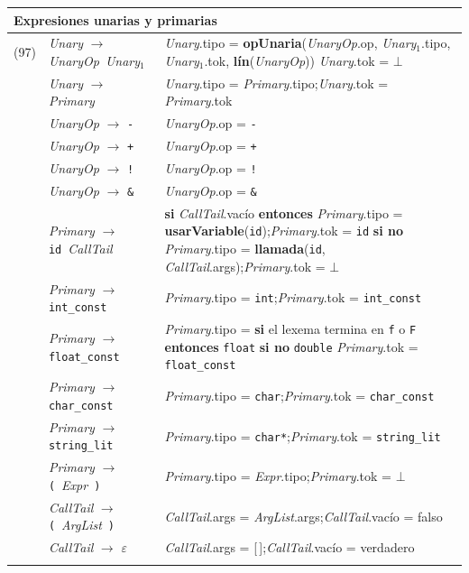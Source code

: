 \documentclass[11pt]{article}
\newcommand{\NT}[1]{\textcolor{ntcolor}{\textit{#1}}}            %
\newcommand{\T}[1]{\textcolor{tcolor}{\texttt{#1}}}              %
\newcommand{\A}[2]{\NT{#1}.\textsf{#2}}                          %
\newcommand{\Ax}[3]{\NT{#1}$_{#2}$.\textsf{#3}}                  %
\newcommand{\fn}[1]{\textsf{\textbf{#1}}}                        %
\newcommand{\ty}[1]{\texttt{#1}}                                 %
\newcommand{\kw}[1]{\textbf{#1}}                                 %
\begin{document}
{\begin{longtable}{@{}r@{\hspace{6pt}}>{\raggedright\arraybackslash}p{5.6cm}@{\hspace{8pt}}>{\raggedright\arraybackslash}p{9.9cm}@{}}
\multicolumn{3}{l}{\textbf{Expresiones unarias y primarias}} \\ \midrule
{(97)} & \NT{Unary} $\rightarrow$ \NT{UnaryOp}\ \NT{Unary}$_{1}$ & \A{Unary}{tipo} = \fn{opUnaria}(\A{UnaryOp}{op}, \Ax{Unary}{1}{tipo}, \Ax{Unary}{1}{tok}, \fn{lín}(\NT{UnaryOp})) \newline \A{Unary}{tok} = $\bot$ \\
\addlinespace[2pt]
{(98)} & \NT{Unary} $\rightarrow$ \NT{Primary} & \A{Unary}{tipo} = \A{Primary}{tipo};\quad \A{Unary}{tok} = \A{Primary}{tok} \\
\addlinespace[2pt]
{(99)} & \NT{UnaryOp} $\rightarrow$ \T{-} & \A{UnaryOp}{op} = \T{-} \\
\addlinespace[2pt]
{(100)} & \NT{UnaryOp} $\rightarrow$ \T{+} & \A{UnaryOp}{op} = \T{+} \\
\addlinespace[2pt]
{(101)} & \NT{UnaryOp} $\rightarrow$ \T{!} & \A{UnaryOp}{op} = \T{!} \\
\addlinespace[2pt]
{(102)} & \NT{UnaryOp} $\rightarrow$ \T{\&} & \A{UnaryOp}{op} = \T{\&} \\
\addlinespace[2pt]
{(103)} & \NT{Primary} $\rightarrow$ \T{id}\ \NT{CallTail} & \kw{si} \A{CallTail}{vacío} \kw{entonces} \A{Primary}{tipo} = \fn{usarVariable}(\T{id});\quad \A{Primary}{tok} = \T{id} \newline \kw{si no} \A{Primary}{tipo} = \fn{llamada}(\T{id}, \A{CallTail}{args});\quad \A{Primary}{tok} = $\bot$ \\
\addlinespace[2pt]
{(104)} & \NT{Primary} $\rightarrow$ \T{int\_const} & \A{Primary}{tipo} = \ty{int};\quad \A{Primary}{tok} = \T{int\_const} \\
\addlinespace[2pt]
{(105)} & \NT{Primary} $\rightarrow$ \T{float\_const} & \A{Primary}{tipo} = \kw{si} el lexema termina en \T{f} o \T{F} \kw{entonces} \ty{float} \kw{si no} \ty{double} \newline \A{Primary}{tok} = \T{float\_const} \\
\addlinespace[2pt]
{(106)} & \NT{Primary} $\rightarrow$ \T{char\_const} & \A{Primary}{tipo} = \ty{char};\quad \A{Primary}{tok} = \T{char\_const} \\
\addlinespace[2pt]
{(107)} & \NT{Primary} $\rightarrow$ \T{string\_lit} & \A{Primary}{tipo} = \ty{char*};\quad \A{Primary}{tok} = \T{string\_lit} \\
\addlinespace[2pt]
{(108)} & \NT{Primary} $\rightarrow$ \T{(}\ \NT{Expr}\ \T{)} & \A{Primary}{tipo} = \A{Expr}{tipo};\quad \A{Primary}{tok} = $\bot$ \\
\addlinespace[2pt]
{(109)} & \NT{CallTail} $\rightarrow$ \T{(}\ \NT{ArgList}\ \T{)} & \A{CallTail}{args} = \A{ArgList}{args};\quad \A{CallTail}{vacío} = \textsf{falso} \\
\addlinespace[2pt]
{(110)} & \NT{CallTail} $\rightarrow$ $\varepsilon$ & \A{CallTail}{args} = [\,];\quad \A{CallTail}{vacío} = \textsf{verdadero} \\
\addlinespace[2pt]
\midrule
\end{longtable}
}
\end{document}
